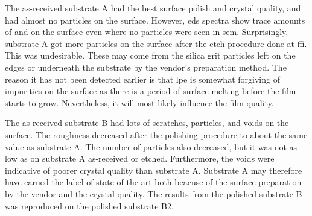 The as-received substrate A had the best surface polish and crystal quality, and had almost no particles on the surface. However, \ac{eds} spectra show trace amounts of  and  on the surface even where no particles were seen in \ac{sem}. Surprisingly, substrate A got more particles on the surface after the etch procedure done at \ac{ffi}. This was undesirable. These may come from the silica grit particles left on the edges or underneath the substrate by the vendor's preparation method. The reason it has not been detected earlier is that \ac{lpe} is somewhat forgiving of impurities on the surface as there is a period of surface melting before the film starts to grow. Nevertheless, it will most likely influence the film quality.



The as-received substrate B had lots of scratches, particles, and voids on the surface. The roughness decreased after the polishing procedure to about the same value as substrate A. The number of particles also decreased, but it was not as low as on substrate A as-received or etched. Furthermore, the voids were indicative of poorer crystal quality than substrate A. Substrate A may therefore have earned the label of state-of-the-art both beacuse of the surface preparation by the vendor and the crystal quality. The results from the polished substrate B was reproduced on the polished substrate B2.


